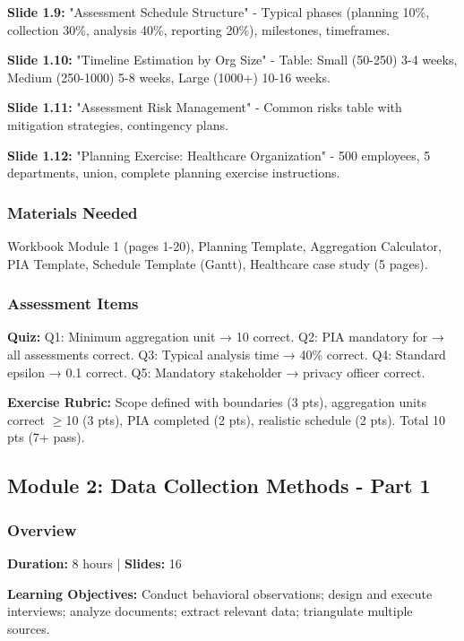 \documentclass[11pt,a4paper]{article}
\begin{document}
\textbf{Slide 1.9:} "Assessment Schedule Structure" - Typical phases (planning 10\%, collection 30\%, analysis 40\%, reporting 20\%), milestones, timeframes.

\textbf{Slide 1.10:} "Timeline Estimation by Org Size" - Table: Small (50-250) 3-4 weeks, Medium (250-1000) 5-8 weeks, Large (1000+) 10-16 weeks.

\textbf{Slide 1.11:} "Assessment Risk Management" - Common risks table with mitigation strategies, contingency plans.

\textbf{Slide 1.12:} "Planning Exercise: Healthcare Organization" - 500 employees, 5 departments, union, complete planning exercise instructions.

\subsubsection{Materials Needed}

Workbook Module 1 (pages 1-20), Planning Template, Aggregation Calculator, PIA Template, Schedule Template (Gantt), Healthcare case study (5 pages).

\subsubsection{Assessment Items}

\textbf{Quiz:} Q1: Minimum aggregation unit → 10 correct. Q2: PIA mandatory for → all assessments correct. Q3: Typical analysis time → 40\% correct. Q4: Standard epsilon → 0.1 correct. Q5: Mandatory stakeholder → privacy officer correct.

\textbf{Exercise Rubric:} Scope defined with boundaries (3 pts), aggregation units correct $\ge$10 (3 pts), PIA completed (2 pts), realistic schedule (2 pts). Total 10 pts (7+ pass).

\subsection{Module 2: Data Collection Methods - Part 1}

\subsubsection{Overview}
\textbf{Duration:} 8 hours | \textbf{Slides:} 16

\textbf{Learning Objectives:} Conduct behavioral observations; design and execute interviews; analyze documents; extract relevant data; triangulate multiple sources.
\end{document}
